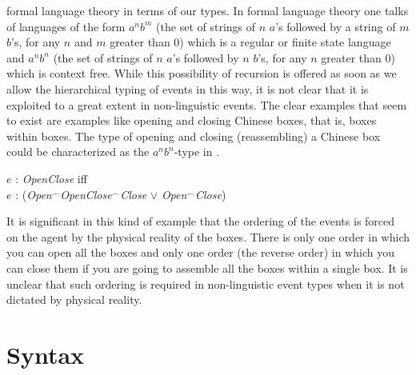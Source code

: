 formal language theory in terms of our types.  In formal language
theory one talks of languages of the form $a^nb^m$ (the set of strings of $n$
$a$'s followed by a string of $m$ $b$'s, for any $n$ and $m$ greater
than 0) which is
a regular or finite state language and $a^nb^n$ (the set of strings of
$n$ $a$'s followed by $n$ $b$'s, for any $n$ greater than 0) which is
context free.  While this possibility of recursion is offered as soon as we allow
the hierarchical typing of events in this way, it is not clear that it
is exploited to a great extent in non-linguistic events.  The clear
examples that seem to exist are examples like opening and closing Chinese boxes, that is,
boxes within boxes.  The type of opening and closing (reassembling) a
Chinese box could be characterized as the $a^nb^n$-type in \nexteg{}.
\begin{ex} 
$e$ : \textit{OpenClose} iff \\
$e$ : (\textit{Open}$^{\frown}$\textit{OpenClose}$^{\frown}$\textit{Close}
$\vee$ \textit{Open}$^{\frown}$\textit{Close}) 
\end{ex} 
It is significant in this kind of example that the ordering of the
events is forced on the agent by the physical reality of the boxes.
There is only one order in which you can open all the boxes and only
one order (the reverse order) in which you can close them if you are
going to assemble all the boxes within a single box.  It is unclear
that such ordering is required in non-linguistic event types when it
is not dictated by physical reality.  



     

\section{Syntax}

